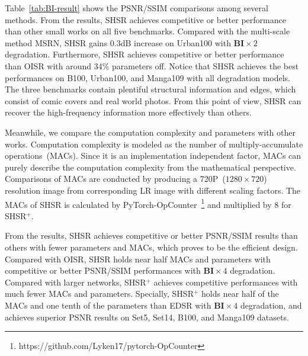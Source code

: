 \documentclass[manuscript,screen]{acmart}
\begin{document}
Table~\ref{tab:BI-result} shows the PSNR/SSIM comparisons among several methods. From the results, SHSR achieves competitive or better performance than other small works on all five benchmarks. Compared with the multi-scale method MSRN, SHSR gains 0.3dB increase on Urban100 with $\textbf{BI}\times2$ degradation. Furthermore, SHSR achieves competitive or better performance than OISR with around 34\% parameters off. Notice that SHSR achieves the best performances on B100, Urban100, and Manga109 with all degradation models. The three benchmarks contain plentiful structural information and edges, which consist of comic covers and real world photos. From this point of view, SHSR can recover the high-frequency information more effectively than others.

Meanwhile, we compare the computation complexity and parameters with other works. 
Computation complexity is modeled as the number of multiply-accumulate operations~(MACs). Since it is an implementation independent factor, MACs can purely describe the computation complexity from the mathematical perspective. Comparisons of MACs are conducted by producing a 720P~($1280\times720$) resolution image from corresponding LR image with different scaling factors. The MACs of SHSR is calculated by PyTorch-OpCounter~\footnote{https://github.com/Lyken17/pytorch-OpCounter} and multiplied by 8 for SHSR$^+$.

From the results, SHSR achieves competitive or better PSNR/SSIM results than others with fewer parameters and MACs, which proves to be the efficient design. Compared with OISR, SHSR holds near half MACs and parameters with competitive or better PSNR/SSIM performances with $\textbf{BI}\times4$ degradation. Compared with larger networks, SHSR$^+$ achieves competitive performances with much fewer MACs and parameters. Specially, SHSR$^+$ holds near half of the MACs and one tenth of the parameters than EDSR with $\textbf{BI}\times4$ degradation, and achieves superior PSNR results on Set5, Set14, B100, and Manga109 datasets.
\end{document}
